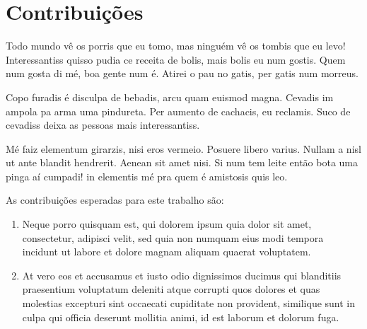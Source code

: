 \section{Contribuições} \label{sec:contrib}
Todo mundo vê os porris que eu tomo, mas ninguém vê os tombis que eu levo! Interessantiss quisso pudia ce receita de bolis, mais bolis eu num gostis. Quem num gosta di mé, boa gente num é. Atirei o pau no gatis, per gatis num morreus.

Copo furadis é disculpa de bebadis, arcu quam euismod magna. Cevadis im ampola pa arma uma pindureta. Per aumento de cachacis, eu reclamis. Suco de cevadiss deixa as pessoas mais interessantiss.

Mé faiz elementum girarzis, nisi eros vermeio. Posuere libero varius. Nullam a nisl ut ante blandit hendrerit. Aenean sit amet nisi. Si num tem leite então bota uma pinga aí cumpadi! in elementis mé pra quem é amistosis quis leo. 

As contribui\c{c}\~{o}es esperadas para este trabalho s\~{a}o:

\begin{enumerate}[label=(\roman*)]
\item Neque porro quisquam est, qui dolorem ipsum quia dolor sit amet, consectetur, adipisci velit, sed quia non numquam eius modi tempora incidunt ut labore et dolore magnam aliquam quaerat voluptatem.

\item At vero eos et accusamus et iusto odio dignissimos ducimus qui blanditiis praesentium voluptatum deleniti atque corrupti quos dolores et quas molestias excepturi sint occaecati cupiditate non provident, similique sunt in culpa qui officia deserunt mollitia animi, id est laborum et dolorum fuga.
\end{enumerate}


